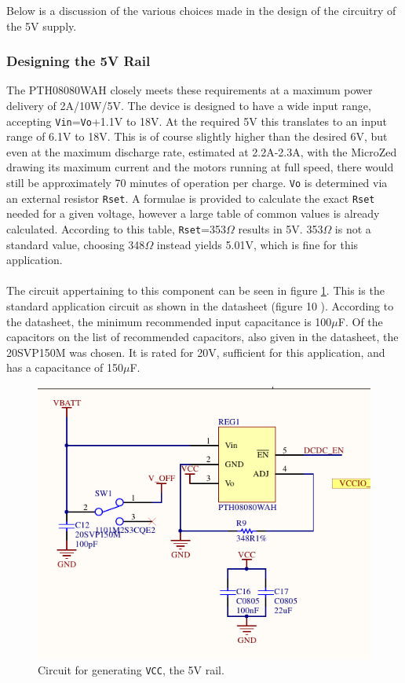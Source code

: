 Below is a discussion of the various choices made in the design of the circuitry of the 5V supply.

\subsubsection*{Designing the 5V Rail}
The PTH08080WAH \cite{pth08080} closely meets these requirements at a maximum power delivery of 2A/10W/5V.
The device is designed to have a wide input range, accepting \texttt{Vin}=\texttt{Vo}+1.1V to 18V.
At the required 5V this translates to an input range of 6.1V to 18V.
This is of course slightly higher than the desired 6V, but even at the maximum discharge rate, estimated at 2.2A-2.3A, with the MicroZed drawing its maximum current and the motors running at full speed, there would still be approximately 70 minutes of operation per charge.
\texttt{Vo} is determined via an external resistor \texttt{Rset}.
A formulae is provided to calculate the exact \texttt{Rset} needed for a given voltage, however a large table of common values is already calculated.
According to this table, \texttt{Rset}=353$\Omega$ results in 5V.
353$\Omega$ is not a standard value, choosing 348$\Omega$ instead yields 5.01V, which is fine for this application.
\\~\\
The circuit appertaining to this component can be seen in figure \ref{fig:pth08080}.
This is the standard application circuit as shown in the datasheet (figure 10 \cite{pth08080}).
According to the datasheet, the minimum recommended input capacitance is 100$\mu$F. 
Of the capacitors on the list of recommended capacitors, also given in the datasheet, the 20SVP150M was chosen.
It is rated for 20V, sufficient for this application, and has a capacitance of 150$\mu$F. 

\begin{figure}[h]
	\centering
	\includegraphics[width=0.6\linewidth]{graphics/5v.pdf}
	\caption{Circuit for generating \texttt{VCC}, the 5V rail.}
	\label{fig:pth08080}
\end{figure}

